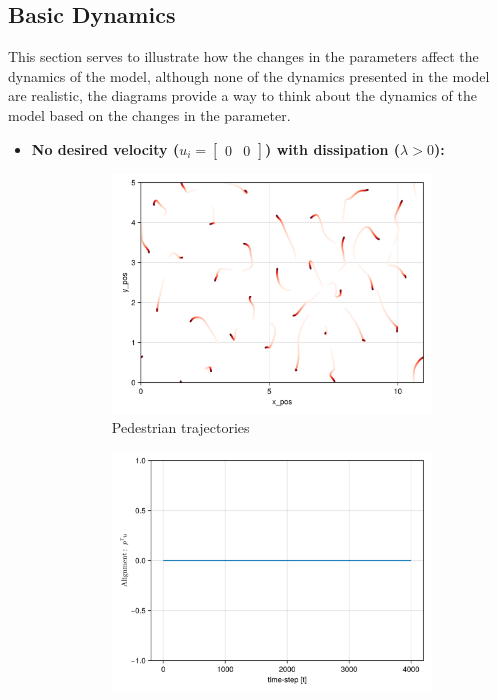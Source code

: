 \subsection{Basic Dynamics}
This section serves to illustrate how the changes in the parameters affect the dynamics of the model, although none of the dynamics presented in the model are realistic, the diagrams provide a way to think about the dynamics of the model based on the changes in the parameter.
\pagebreak
\begin{itemize}
    \item \textbf{No desired velocity ($u_i = \begin{bmatrix} 0 & 0 \end{bmatrix}$) with dissipation ($\lambda > 0$):}
\begin{figure}[H]
    \centering
    \begin{subfigure}{0.49\textwidth}
        \centering
        \includegraphics[width=\linewidth]{figures/ch5_basic/traj_crys_4000.png}
        \caption{Pedestrian trajectories}
        \label{plot:crys_traj}
    \end{subfigure}
    \begin{subfigure}{.49\textwidth}
        \centering
        \includegraphics[width=\linewidth]{figures/ch5_basic/straight_crys.png}

\end{subfigure}
\end{figure}
\end{itemize}

